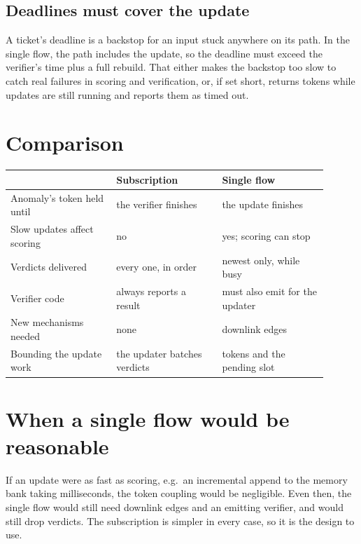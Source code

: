 \documentclass[11pt]{article}
\begin{document}
\subsection{Deadlines must cover the update}

A ticket's deadline is a backstop for an input stuck anywhere on its path. In
the single flow, the path includes the update, so the deadline must exceed the
verifier's time plus a full rebuild. That either makes the backstop too slow
to catch real failures in scoring and verification, or, if set short, returns
tokens while updates are still running and reports them as timed out.

\section{Comparison}

\begin{center}
\small
\begin{tabular}{@{}p{0.3\linewidth}p{0.3\linewidth}p{0.3\linewidth}@{}}
\toprule
& Subscription & Single flow \\
\midrule
Anomaly's token held until & the verifier finishes & the update finishes \\
Slow updates affect scoring & no & yes; scoring can stop \\
Verdicts delivered & every one, in order & newest only, while busy \\
Verifier code & always reports a result & must also emit for the updater \\
New mechanisms needed & none & downlink edges \\
Bounding the update work & the updater batches verdicts & tokens and the pending slot \\
\bottomrule
\end{tabular}
\end{center}

\section{When a single flow would be reasonable}

If an update were as fast as scoring, e.g.\ an incremental append to the
memory bank taking milliseconds, the token coupling would be negligible. Even
then, the single flow would still need downlink edges and an emitting
verifier, and would still drop verdicts. The subscription is simpler in every
case, so it is the design to use.
\end{document}
